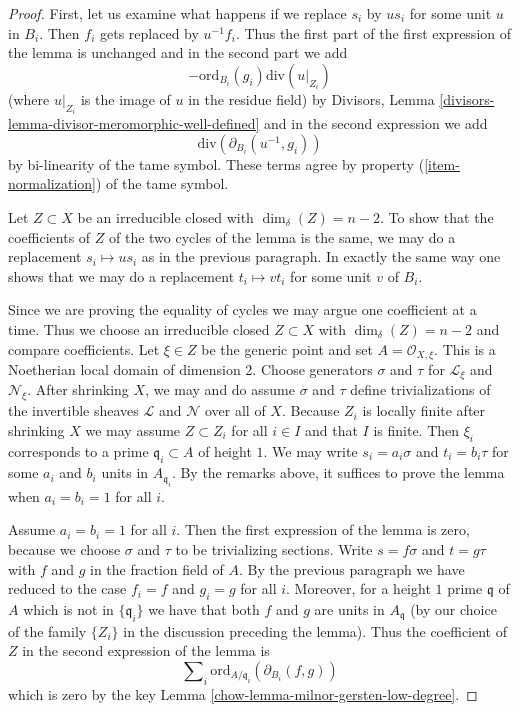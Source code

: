 \begin{proof}

First, let us examine what happens if we replace $s_i$ by $us_i$
for some unit $u$ in $B_i$. Then $f_i$ gets replaced by $u^{-1} f_i$.
Thus the first part of the first expression of the lemma is unchanged
and in the second part we add
$$
-\text{ord}_{B_i}(g_i)\text{div}(u|_{Z_i})
$$
(where $u|_{Z_i}$ is the image of $u$ in the residue field) by
Divisors, Lemma \ref{divisors-lemma-divisor-meromorphic-well-defined}
and in the second expression we add
$$
\text{div}(\partial_{B_i}(u^{-1}, g_i))
$$
by bi-linearity of the tame symbol. These terms agree by property
(\ref{item-normalization}) of the tame symbol.

\medskip\noindent
Let $Z \subset X$ be an irreducible closed with $\dim_\delta(Z) = n - 2$.
To show that the coefficients of $Z$ of the two cycles of the lemma
is the same, we may do a replacement $s_i \mapsto us_i$ as in the previous
paragraph. In exactly the same way one shows that we may do a replacement
$t_i \mapsto vt_i$ for some unit $v$ of $B_i$.

\medskip\noindent
Since we are proving the equality of cycles we may argue one coefficient
at a time. Thus we choose an irreducible closed $Z \subset X$
with $\dim_\delta(Z) = n - 2$ and compare coefficients. Let $\xi \in Z$
be the generic point and set $A = \mathcal{O}_{X, \xi}$. This is a Noetherian
local domain of dimension $2$. Choose generators $\sigma$ and $\tau$
for $\mathcal{L}_\xi$ and $\mathcal{N}_\xi$. After shrinking $X$, we may
and do assume $\sigma$ and $\tau$ define trivializations
of the invertible sheaves $\mathcal{L}$ and $\mathcal{N}$ over all of $X$.
Because $Z_i$ is locally
finite after shrinking $X$ we may assume $Z \subset Z_i$ for all $i \in I$
and that $I$ is finite. Then $\xi_i$ corresponds to a prime
$\mathfrak q_i \subset A$ of height $1$.
We may write $s_i = a_i \sigma$ and $t_i = b_i \tau$
for some $a_i$ and $b_i$ units in $A_{\mathfrak q_i}$.
By the remarks above, it suffices to prove the lemma when
$a_i = b_i = 1$ for all $i$.

\medskip\noindent
Assume $a_i = b_i = 1$ for all $i$. Then the first expression of the
lemma is zero, because we choose $\sigma$ and $\tau$ to be trivializing
sections. Write $s = f\sigma$ and $t = g \tau$ with $f$ and $g$ in the
fraction field of $A$. By the previous paragraph we have reduced to the case
$f_i = f$ and $g_i = g$ for all $i$. Moreover, for a height $1$ prime
$\mathfrak q$ of $A$ which is not in $\{\mathfrak q_i\}$ we have
that both $f$ and $g$ are units in $A_\mathfrak q$ (by our choice of
the family $\{Z_i\}$ in the discussion preceding the lemma). Thus
the coefficient of $Z$ in the second expression of the lemma is
$$
\sum\nolimits_i \text{ord}_{A/\mathfrak q_i}(\partial_{B_i}(f, g))
$$
which is zero by the key Lemma \ref{chow-lemma-milnor-gersten-low-degree}.
\end{proof}

